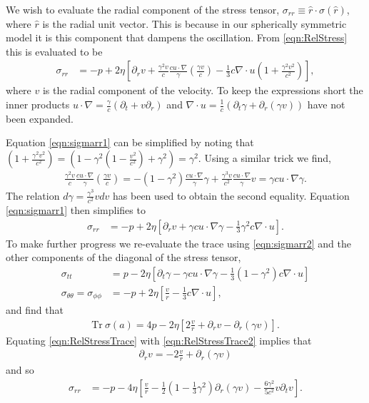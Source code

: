 \documentclass[10pt, fleqn,draft,showtrims,oldfontcommands]{article} %
\newcommand{\eqnref}[1]{\ref{eqn:#1}}
\newcommand{\lr}[1]{\left( #1 \right)}
\newcommand{\lrsquare}[1]{\left[ #1 \right]}
\renewcommand{\d}{\partial}
\newcommand{\del}{\nabla}
\newcommand{\dr}{{\d_r}}
\newcommand{\dt}{{\d_t}}
\newcommand{\Tr}{\textrm{Tr}}
\begin{document}
We wish to evaluate the radial component of the stress tensor, $\sigma_{rr} \equiv \hat r \cdot \sigma(\hat r)$, where $\hat r$ is the radial unit vector.
This is because in our spherically symmetric model it is this component that dampens the oscillation.
From \eqnref{RelStress} this is evaluated to be 
\begin{align}
  \sigma_{rr}  &= -p + 2\eta \lrsquare{\dr v + \tfrac{\gamma^2 v}{c} \tfrac{c u\cdot \del }{\gamma}\lr{\tfrac{\gamma v}{c}} - \tfrac{1}{3} c\del\cdot u\lr{1 + \tfrac{\gamma^2v^2}{c^2}}}, \label{eqn:sigmarr1}
\end{align}
where $v$ is the radial component of the velocity.
To keep the expressions short  the inner products $ u\cdot \del = \frac{\gamma }{c} \lr{\dt + v \dr}$ and $\del\cdot u = \frac{1}{c}\lr{\dt\gamma + \dr(\gamma v)}$ have not been expanded.

Equation \eqnref{sigmarr1} can be simplified by noting that $\lr{1 + \tfrac{\gamma^2v^2}{c^2}} = \lr{1 - \gamma^2\lr{1-\tfrac{v^2}{c^2}} + \gamma^2 } =  \gamma^2$.
Using a similar trick we find,
\begin{align}
   \frac{\gamma^2 v}{c} \frac{c u\cdot \del }{\gamma}\lr{\frac{\gamma v}{c}} 
=-\lr{1-\gamma^2 } \frac{c u\cdot \del }{\gamma}\gamma +\frac{\gamma^3 v}{c^2} \frac{c u\cdot \del }{\gamma}v
=\gamma c u\cdot \del \gamma. 
\end{align}
The relation $d \gamma = \frac{\gamma^3}{c^2} v d v$ has been used to obtain the second equality.
Equation \eqnref{sigmarr1} then simplifies to
\begin{align}
  \sigma_{rr}  &= -p + 2\eta \lrsquare{\dr v + \gamma c u\cdot \del\gamma - \tfrac{1}{3}\gamma^2 c\del\cdot u}. \label{eqn:sigmarr2}
\end{align}
To make further progress we re-evaluate the trace using \eqnref{sigmarr2} and the other components of the diagonal of the stress tensor,
\begin{align}
  \sigma_{tt} &= p - 2 \eta \lrsquare{\dt \gamma - \gamma c u \cdot \del \gamma - \tfrac{1}{3} \lr{1-\gamma^2} c \del\cdot u    }\\
  \sigma_{\theta\theta} =  \sigma_{\phi\phi}  &= -p + 2\eta\lrsquare{\tfrac{v}{r} - \tfrac{1}{3} c \del \cdot u},
\end{align}
and find that 
\begin{align}
  \Tr\ \sigma(a) = 4p - 2 \eta \lrsquare{2 \tfrac{v}{r} + \dr v - \dr(\gamma v) }.\label{eqn:RelStressTrace2}
\end{align}
Equating \eqnref{RelStressTrace} with \eqnref{RelStressTrace2} implies that
\begin{align}
  \dr v = - 2 \frac{v}{r}  + \dr(\gamma v)
\end{align}
and so
\begin{align}
  \sigma_{rr}  &= -p - 4\eta \lrsquare{  \frac{v}{r}  -\tfrac{1}{2}\lr{1-\tfrac{1}{3}\gamma^2}\dr(\gamma v) - \tfrac{6\gamma^2}{5c^2} v \dt v  }. \label{eqn:sigmarr3}
\end{align}
\end{document}
